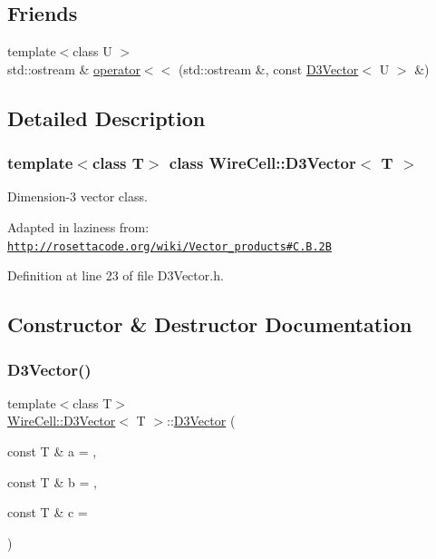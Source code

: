 \subsection*{Friends}
\begin{DoxyCompactItemize}
\item 
{\footnotesize template$<$class U $>$ }\\std\+::ostream \& \hyperlink{class_wire_cell_1_1_d3_vector_af5d9b1d051306777ae5d07608467d1a0}{operator$<$$<$} (std\+::ostream \&, const \hyperlink{class_wire_cell_1_1_d3_vector}{D3\+Vector}$<$ U $>$ \&)
\end{DoxyCompactItemize}


\subsection{Detailed Description}
\subsubsection*{template$<$class T$>$\newline
class Wire\+Cell\+::\+D3\+Vector$<$ T $>$}

Dimension-\/3 vector class.

Adapted in laziness from\+: \href{http://rosettacode.org/wiki/Vector_products#C.2B.2B}{\tt http\+://rosettacode.\+org/wiki/\+Vector\+\_\+products\#\+C.\+B.\+2B} 

Definition at line 23 of file D3\+Vector.\+h.



\subsection{Constructor \& Destructor Documentation}
\mbox{\label{class_wire_cell_1_1_d3_vector_a0bb7ef1f53b89ca0c137d8ccb3b246af}} 
\subsubsection{\texorpdfstring{D3\+Vector()}{D3Vector()}\hspace{0.1cm}{\footnotesize\ttfamily [1/4]}}
{\footnotesize\ttfamily template$<$class T$>$ \\
\hyperlink{class_wire_cell_1_1_d3_vector}{Wire\+Cell\+::\+D3\+Vector}$<$ T $>$\+::\hyperlink{class_wire_cell_1_1_d3_vector}{D3\+Vector} (\begin{DoxyParamCaption}\item[{const T \&}]{a = {},  }\item[{const T \&}]{b = {},  }\item[{const T \&}]{c = {} }\end{DoxyParamCaption})\hspace{0.3cm}{\ttfamily [inline]}}



